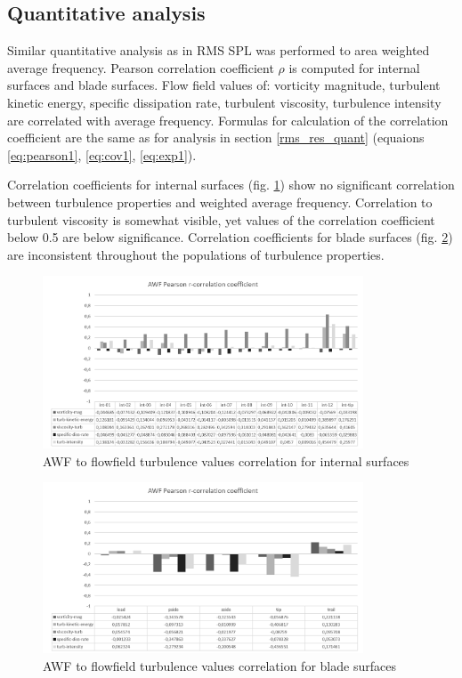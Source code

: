 \subsection{Quantitative analysis} \label{fft_res_quant}
Similar quantitative analysis as in RMS SPL was performed to area weighted average frequency. Pearson correlation coefficient $\rho$ is computed for internal surfaces and blade surfaces. Flow field values of: vorticity magnitude, turbulent kinetic energy, specific dissipation rate, turbulent viscosity, turbulence intensity are correlated with average frequency. Formulas for calculation of the correlation coefficient are the same as for analysis in section \ref{rms_res_quant} (equaions \ref{eq:pearson1}, \ref{eq:cov1}, \ref{eq:exp1}).

Correlation coefficients for internal surfaces (fig. \ref{awf_corr_int}) show no significant correlation between turbulence properties and weighted average frequency. Correlation to turbulent viscosity is somewhat visible, yet values of the correlation coefficient below 0.5 are below significance. Correlation coefficients for blade surfaces (fig. \ref{awf_corr_blade}) are inconsistent throughout the populations of turbulence properties. 

\begin{figure}[h!]
\centering %
\includegraphics[width=0.85\textwidth]{Pictures/awf_pearson_int.png}
\caption{AWF to flowfield turbulence values correlation for internal surfaces}
\label{awf_corr_int}
\end{figure}

\begin{figure}[h!]
\centering %
\includegraphics[width=0.85\textwidth]{Pictures/awf_pearson_blade.png}
\caption{AWF to flowfield turbulence values correlation for blade surfaces}
\label{awf_corr_blade}
\end{figure}